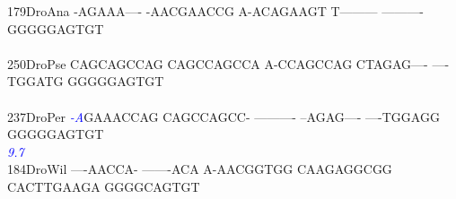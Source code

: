 \documentclass[11pt,twoside,reqno,a4paper]{article}
\begin{document}
{179\hspace*{1\charwidth}DroAna	-AGAAA----	-AACGAACCG	A-ACAGAAGT	T---------	----------	GGGGGAGTGT	\\
\hspace*{4\charwidth}\hspace*{7\charwidth}\hspace*{1\charwidth}\hspace*{1\charwidth}\hspace*{1\charwidth}\hspace*{1\charwidth}\hspace*{1\charwidth}\hspace*{1\charwidth}\\
250\hspace*{1\charwidth}DroPse	CAGCAGCCAG	CAGCCAGCCA	A-CCAGCCAG	CTAGAG----	----TGGATG	GGGGGAGTGT	\\
\hspace*{4\charwidth}\hspace*{7\charwidth}\hspace*{1\charwidth}\hspace*{1\charwidth}\hspace*{1\charwidth}\hspace*{1\charwidth}\hspace*{1\charwidth}\hspace*{1\charwidth}\\
237\hspace*{1\charwidth}DroPer	\textit{\textcolor{Blue}{-}}\textit{\textcolor{Blue}{A}}GAAACCAG	CAGCCAGCC-	----------	--AGAG----	----TGGAGG	GGGGGAGTGT	\\
\hspace*{4\charwidth}\hspace*{7\charwidth}\hspace*{0\charwidth}\textit{\textcolor{Blue}{9.7}}\hspace*{1\charwidth}\hspace*{1\charwidth}\hspace*{1\charwidth}\hspace*{1\charwidth}\hspace*{1\charwidth}\hspace*{1\charwidth}\\
184\hspace*{1\charwidth}DroWil	----AACCA-	-------ACA	A-AACGGTGG	CAAGAGGCGG	CACTTGAAGA	GGGGCAGTGT	\\
\hspace*{4\charwidth}\hspace*{7\charwidth}\hspace*{1\charwidth}\hspace*{1\charwidth}\hspace*{1\charwidth}\hspace*{1\charwidth}\hspace*{1\charwidth}\hspace*{1\charwidth}\\
}
\end{document}
